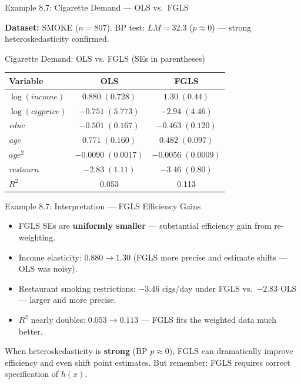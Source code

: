 \documentclass[aspectratio=169, 12pt]{beamer}
\begin{document}
\begin{frame}{Example 8.7: Cigarette Demand — OLS vs.\ FGLS}

  \textbf{Dataset:} SMOKE ($n=807$). BP test: $LM=32.3$ ($p\approx 0$) — strong heteroskedasticity confirmed.

  \begin{examplebox}{Cigarette Demand: OLS vs. FGLS (SEs in parentheses)}
    \begin{center}
      \footnotesize
      \begin{tabular}{lcc}
        \toprule
        Variable & OLS & FGLS \\
        \midrule
        $\log(\textit{income})$   & $0.880\;(0.728)$  & $1.30\;(0.44)$ \\
        $\log(\textit{cigprice})$ & $-0.751\;(5.773)$ & $-2.94\;(4.46)$ \\
        \textit{educ}             & $-0.501\;(0.167)$ & $-0.463\;(0.120)$ \\
        \textit{age}              & $0.771\;(0.160)$  & $0.482\;(0.097)$ \\
        $\textit{age}^2$          & $-0.0090\;(0.0017)$ & $-0.0056\;(0.0009)$ \\
        \textit{restaurn}         & $-2.83\;(1.11)$   & $-3.46\;(0.80)$ \\
        \midrule
        $R^2$ & 0.053 & 0.113 \\
        \bottomrule
      \end{tabular}
    \end{center}
  \end{examplebox}

\end{frame}

\begin{frame}{Example 8.7: Interpretation — FGLS Efficiency Gains}

  \begin{keybox}
    \begin{itemize}
      \item FGLS SEs are \textbf{uniformly smaller} — substantial efficiency gain from re-weighting.
      \item Income elasticity: $0.880 \to 1.30$ (FGLS more precise and estimate shifts — OLS was noisy).
      \item Restaurant smoking restrictions: $-3.46$ cigs/day under FGLS vs.\ $-2.83$ OLS — larger and more precise.
      \item $R^2$ nearly doubles: $0.053 \to 0.113$ — FGLS fits the weighted data much better.
    \end{itemize}
  \end{keybox}

  \smallskip

  \begin{highlightbox}
    When heteroskedasticity is \textbf{strong} (BP $p \approx 0$), FGLS can dramatically improve efficiency and even shift point estimates. But remember: FGLS requires correct specification of $h(x)$.
  \end{highlightbox}

\end{frame}
\end{document}
